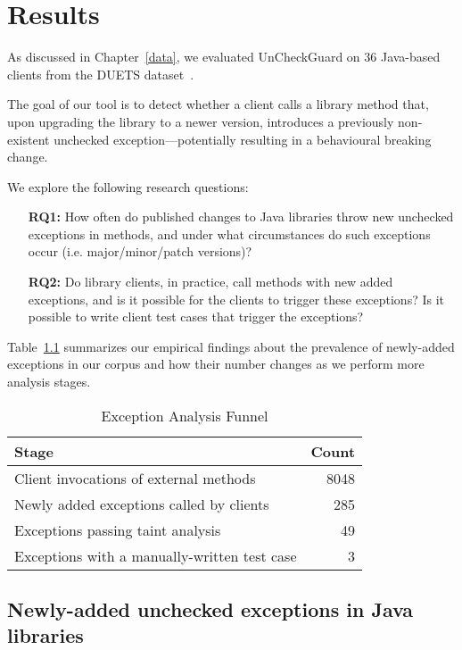 \chapter{Results}
As discussed in Chapter~\ref{data}, we evaluated UnCheckGuard on 36 Java-based clients from the DUETS dataset~\cite{durieux21:_duets}.

The goal of our tool is to detect whether a client calls a library method that, upon upgrading the library to a newer version, introduces a previously non-existent unchecked exception—potentially resulting in a behavioural breaking change.

We explore the following research questions:

\begin{itemize}
  \item[\textbf{RQ1:}] How often do published changes to Java libraries throw new unchecked exceptions in methods,
and under what circumstances do such exceptions occur (i.e. major/minor/patch versions)?
  \item[\textbf{RQ2:}]  Do library clients, in practice, call methods with new added exceptions, and is it possible for the clients to trigger these exceptions? Is it possible to write client test cases that trigger the exceptions?
\end{itemize}

Table~\ref{tab:exception-funnel} summarizes our empirical findings about the prevalence of newly-added exceptions in our corpus and how their number changes as we perform more analysis stages.

\begin{table}[h]
\centering
\caption{Exception Analysis Funnel}
\label{tab:exception-funnel}
\begin{tabular}{l r}
\toprule
\textbf{Stage} & \textbf{Count} \\
\midrule
Client invocations of external methods & 8048 \\
Newly added exceptions called by clients & 285 \\
Exceptions passing taint analysis & 49 \\
Exceptions with a manually-written test case & 3 \\
\bottomrule
\end{tabular}
\end{table}


\section{Newly-added unchecked exceptions in Java libraries}

